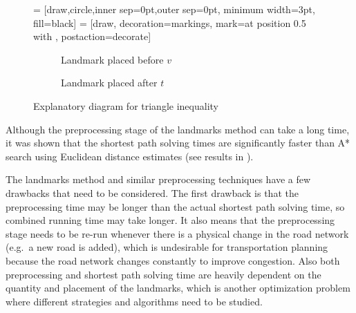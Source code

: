 \begin{figure}[H]
    \centering
     = [draw,circle,inner sep=0pt,outer sep=0pt, minimum width=3pt, fill=black]
     = [draw, decoration={markings, mark=at position 0.5 with {\arrow{>}}}, postaction={decorate}]
    \begin{subfigure}[t]{.4\textwidth}
        \centering
        \caption{Landmark placed before $v$}
    \end{subfigure}
    \hspace{1cm}
    \begin{subfigure}[t]{.4\textwidth}
        \centering
        \caption{Landmark placed after $t$}
    \end{subfigure}
    \caption{Explanatory diagram for triangle inequality}
    \label{fig:landmarks}
\end{figure}

Although the preprocessing stage of the landmarks method can take a long time,
it was shown that the shortest path solving times are significantly faster than A* search using Euclidean distance estimates (see results in \citet{GoldbergLandmarks}).

The landmarks method and similar preprocessing techniques have a few drawbacks that need to be considered.
The first drawback is that the preprocessing time may be longer than the actual shortest path solving time,
so combined running time may take longer.
It also means that the preprocessing stage needs to be re-run whenever there is a physical change in the road network (e.g.\ a new road is added),
which is undesirable for transportation planning because the road network changes constantly to improve congestion.
Also both preprocessing and shortest path solving time are heavily dependent on the quantity and placement of the landmarks,
which is another optimization problem where different strategies and algorithms need to be studied.

